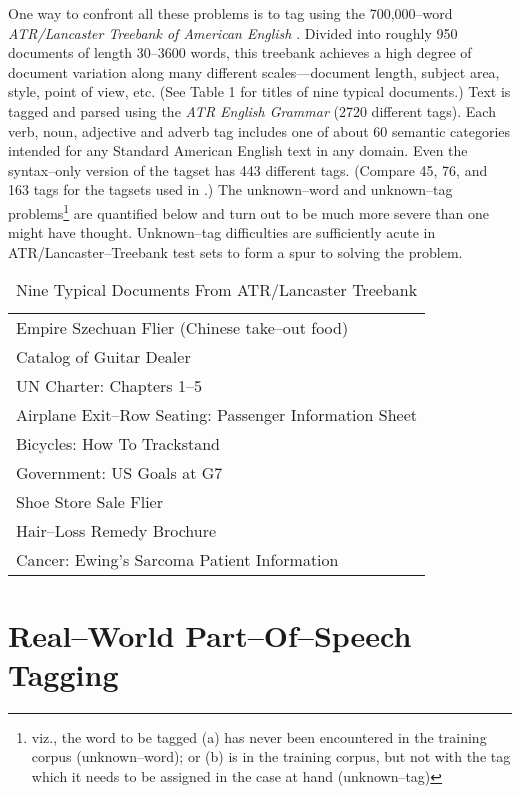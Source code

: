 One way to confront all these problems is to tag using the 700,000--word
{\em ATR/Lancaster Treebank of American English}
\cite{Black+al:treebank}.  Divided into roughly 950 documents of
length 30--3600 words, this treebank achieves a high degree of
document variation along many different scales---document length,
subject area, style, point of view, etc. (See Table 1 for titles of
nine typical documents.) Text is tagged and parsed using the {\em ATR
English Grammar} (2720 different tags). Each verb, noun, adjective and
adverb tag includes one of about 60 semantic categories intended for
any Standard American English text in any domain. Even the
syntax--only version of the tagset has 443 different tags. (Compare
45, 76, and 163 tags for the tagsets used in
\cite{Brill:advances,Weischedel+al:class,Merialdo:tagging,Black+al:tag}.)
The unknown--word and unknown--tag problems\footnote{viz., the word to
be tagged (a) has never been encountered in the training corpus
(unknown--word); or (b) is in the training corpus, but not with the
tag which it needs to be assigned in the case at hand (unknown--tag)}
are quantified below and turn out to be much more severe than one
might have thought. Unknown--tag difficulties are sufficiently acute
in ATR/Lancaster--Treebank test sets to form a spur to solving the
problem.

\begin{table}
\begin{center}
\caption{Nine Typical Documents From ATR/Lancaster Treebank}
\renewcommand{\arraystretch}{}
\begin{tabular}{|l|}
\hline
Empire Szechuan Flier (Chinese take--out food) \\
Catalog of Guitar Dealer \\
UN Charter: Chapters 1--5 \\
Airplane Exit--Row Seating: Passenger Information Sheet \\
Bicycles: How To Trackstand \\
Government: US Goals at G7 \\
Shoe Store Sale Flier \\
Hair--Loss Remedy Brochure \\
Cancer: Ewing's Sarcoma Patient Information \\
\hline
\end{tabular}
\renewcommand{\arraystretch}{}
\end{center}
\end{table}

\section{Real--World Part--Of--Speech Tagging}

